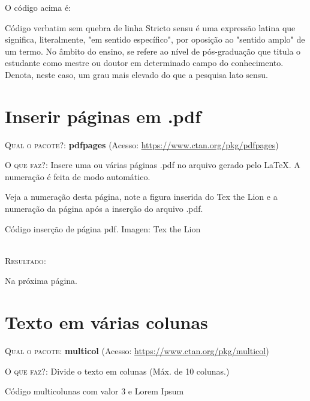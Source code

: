 \documentclass[a4paper,12pt,oneside,openright,extrafontsizes,openbib]{memoir}
\begin{document}
{O código acima é:

\begin{codex}{Código verbatim sem quebra de linha}
Stricto sensu é uma expressão latina que significa, literalmente, "em sentido específico", por oposição ao "sentido amplo" de um termo. No âmbito do ensino, se refere ao nível de pós-graduação que titula o estudante como mestre ou doutor em determinado campo do conhecimento. Denota, neste caso, um grau mais elevado do que a pesquisa lato sensu.
\end{codex}
\chapter{Inserir páginas em .pdf}

\textsc{Qual o pacote?}: \textbf{pdfpages} (Acesso: \url{https://www.ctan.org/pkg/pdfpages})

\textsc{O que faz?}: Insere uma ou várias páginas .pdf no arquivo gerado pelo \LaTeX. A numeração é feita de modo automático.

Veja a numeração desta página, note a figura inserida do Tex the Lion e a numeração da página após a inserção do arquivo .pdf.
\ \\

\begin{codex}{Código inserção de página pdf. Imagen: Tex the Lion}

\end{codex}
\ \\

\textsc{Resultado}:

Na próxima página.


\chapter{Texto em várias colunas}

\textsc{Qual o pacote:} \textbf{multicol} (Acesso: \url{https://www.ctan.org/pkg/multicol})

\textsc{O que faz?}: Divide o texto em colunas (Máx. de 10 colunas.)
\ \\

\begin{codex}{Código multicolunas com valor 3 e Lorem Ipsum}
\begin{multicols}{3}
\lipsum[2]
\end{multicols}
\end{codex}
\ \\

}
\end{document}
